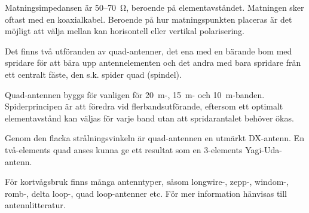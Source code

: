Matningsimpedansen är 50--70~Ω, beroende på elementavståndet.
Matningen sker oftast med en koaxialkabel. Beroende på hur
matningspunkten placeras är det möjligt att välja mellan kan
horisontell eller vertikal polarisering.

Det finns två utföranden av quad-antenner, det ena med en bärande bom
med spridare för att bära upp antennelementen och det andra med bara
spridare från ett centralt fäste, den s.k. spider quad (spindel).

Quad-antennen byggs för vanligen för 20~m-, 15~m- och 10~m-banden.
Spiderprincipen är att föredra vid flerbandsutförande, eftersom ett
optimalt elementavstånd kan väljas för varje band utan att spridarantalet
behöver ökas.

Genom den flacka strålningsvinkeln är quad-antennen en utmärkt
DX-antenn. En två-elements quad anses kunna ge ett resultat som en
3-elements Yagi-Uda-antenn.

För kortvågsbruk finns många antenntyper, såsom longwire-, zepp-,
windom-, romb-, delta loop-, quad loop-antenner etc. För mer
information hänvisas till antennlitteratur.
